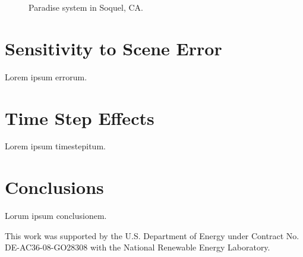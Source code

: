 \documentclass[twocolumn,10pt]{asme2ej}
\begin{document}
\begin{figure}[h!]
\begin{center}
\end{center}
\caption{Paradise system in Soquel, CA.}
\label{fig:paradise}
\end{figure}



\section{Sensitivity to Scene Error}

Lorem ipsum errorum.

\section{Time Step Effects}

Lorem ipsum timestepitum.

\section{Conclusions}

Lorum ipsum conclusionem.


\begin{acknowledgment}
This work was supported by the U.S. Department of Energy under Contract No. DE-AC36-08-GO28308 with the National Renewable Energy Laboratory.
\end{acknowledgment}
\end{document}
